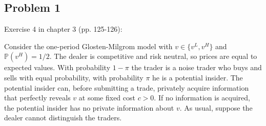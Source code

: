 \documentclass[11pt
, answers
]{exam}
\begin{document}
%
%	





\qquad
\subsection*{Problem 1}

Exercise 4 in chapter 3 (pp. 125-126):

Consider the one-period Glosten-Milgrom model with $v \in \{v^L, v^H\}$ and $\mathbb{P}(v^H)=1/2$. The dealer is competitive and risk neutral, so prices are equal to expected values. With probability $1-\pi$ the trader is a noise trader who buys and sells with equal probability, with probability $\pi$ he is a potential insider. The potential insider can, before submitting a trade, privately acquire information that perfectly reveals $v$ at some fixed cost $c>0$. If no information is acquired, the potential insider has no private information about $v$. As usual, suppose the dealer cannot distinguish the traders.
\end{document}
